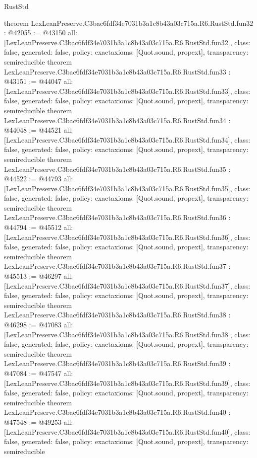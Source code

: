 \begin{lexlean}{RustStd}
\begin{coremodule}
{}
theorem LexLeanPreserve.C3bac6fdf34e7031b3a1c8b43a03c715a.R6.RustStd.fun32 : @42055 := @43150 {
  all: [LexLeanPreserve.C3bac6fdf34e7031b3a1c8b43a03c715a.R6.RustStd.fun32],
  class: false,
  generated: false,
  policy: exact{axioms: [Quot.sound, propext]},
  transparency: semireducible
}
theorem LexLeanPreserve.C3bac6fdf34e7031b3a1c8b43a03c715a.R6.RustStd.fun33 : @43151 := @44047 {
  all: [LexLeanPreserve.C3bac6fdf34e7031b3a1c8b43a03c715a.R6.RustStd.fun33],
  class: false,
  generated: false,
  policy: exact{axioms: [Quot.sound, propext]},
  transparency: semireducible
}
theorem LexLeanPreserve.C3bac6fdf34e7031b3a1c8b43a03c715a.R6.RustStd.fun34 : @44048 := @44521 {
  all: [LexLeanPreserve.C3bac6fdf34e7031b3a1c8b43a03c715a.R6.RustStd.fun34],
  class: false,
  generated: false,
  policy: exact{axioms: [Quot.sound, propext]},
  transparency: semireducible
}
theorem LexLeanPreserve.C3bac6fdf34e7031b3a1c8b43a03c715a.R6.RustStd.fun35 : @44522 := @44793 {
  all: [LexLeanPreserve.C3bac6fdf34e7031b3a1c8b43a03c715a.R6.RustStd.fun35],
  class: false,
  generated: false,
  policy: exact{axioms: [Quot.sound, propext]},
  transparency: semireducible
}
theorem LexLeanPreserve.C3bac6fdf34e7031b3a1c8b43a03c715a.R6.RustStd.fun36 : @44794 := @45512 {
  all: [LexLeanPreserve.C3bac6fdf34e7031b3a1c8b43a03c715a.R6.RustStd.fun36],
  class: false,
  generated: false,
  policy: exact{axioms: [Quot.sound, propext]},
  transparency: semireducible
}
theorem LexLeanPreserve.C3bac6fdf34e7031b3a1c8b43a03c715a.R6.RustStd.fun37 : @45513 := @46297 {
  all: [LexLeanPreserve.C3bac6fdf34e7031b3a1c8b43a03c715a.R6.RustStd.fun37],
  class: false,
  generated: false,
  policy: exact{axioms: [Quot.sound, propext]},
  transparency: semireducible
}
theorem LexLeanPreserve.C3bac6fdf34e7031b3a1c8b43a03c715a.R6.RustStd.fun38 : @46298 := @47083 {
  all: [LexLeanPreserve.C3bac6fdf34e7031b3a1c8b43a03c715a.R6.RustStd.fun38],
  class: false,
  generated: false,
  policy: exact{axioms: [Quot.sound, propext]},
  transparency: semireducible
}
theorem LexLeanPreserve.C3bac6fdf34e7031b3a1c8b43a03c715a.R6.RustStd.fun39 : @47084 := @47547 {
  all: [LexLeanPreserve.C3bac6fdf34e7031b3a1c8b43a03c715a.R6.RustStd.fun39],
  class: false,
  generated: false,
  policy: exact{axioms: [Quot.sound, propext]},
  transparency: semireducible
}
theorem LexLeanPreserve.C3bac6fdf34e7031b3a1c8b43a03c715a.R6.RustStd.fun40 : @47548 := @49253 {
  all: [LexLeanPreserve.C3bac6fdf34e7031b3a1c8b43a03c715a.R6.RustStd.fun40],
  class: false,
  generated: false,
  policy: exact{axioms: [Quot.sound, propext]},
  transparency: semireducible
}
\end{coremodule}
\end{lexlean}
